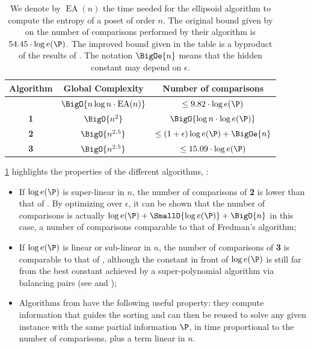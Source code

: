 \begin{table}
	\begin{center}
	\caption{We denote by $\operatorname{EA}(n)$ the time needed for the ellipsoid algorithm
to compute the entropy of a poset of order $n$. The original bound given by
\citet*{kahn:1995} on the number of comparisons performed by their algorithm is
$54.45 \cdot \log e(\P)$. The improved bound given in the table is a byproduct
of the results of \citet*{cardinal:2013}. The notation $\BigOe{n}$ means
that the hidden constant may depend on $\epsilon$.}
	\label{tree:supi:table/jcardin}
	\begin{tabular}{|c|c|c|}

	\hline
	Algorithm & Global Complexity & Number of comparisons\\\hline\hline
	\citet*{kahn:1995} & $\BigO{n \log n \cdot \operatorname{EA}(n)}$ & $\leq 9.82 \cdot \log
e(\P)$\\\hline\hline
	\citet*{cardinal:2013} \textbf{1} & $ \BigO{n^{2}} $ & $\BigO{\log n \cdot
\log e(\P)}$ \\\hline
	\citet*{cardinal:2013} \textbf{2} & $ \BigO{n^{2.5}} $ & $\leq (1 +
\epsilon) \log e(\P) + \BigOe{n}$ \\\hline
	\citet*{cardinal:2013} \textbf{3} & $ \BigO{n^{2.5}} $ & $\leq 15.09 \cdot
\log e(\P)$ \\\hline

	\end{tabular}
	\end{center}
\end{table}


\ref{tree:supi:table/jcardin} highlights the properties of the different
algorithms, \ie:
\begin{itemize}

\item If $\log e(\P)$ is super-linear in $n$, the number of comparisons of
\citet*{cardinal:2013} \textbf{2} is lower than that of \citet*{kahn:1995}. By
optimizing over $\epsilon$, it can be shown that the number of comparisons is
actually $\log e(\P) + \SmallO{\log e(\P)} + \BigO{n}$ in this case, a number of
comparisons comparable to that of Fredman’s algorithm;

\item If $\log e(\P)$ is linear or sub-linear in $n$, the number of comparisons
of \citet*{cardinal:2013} \textbf{3} is comparable to that of
\citet*{kahn:1995}, although the constant in front of $\log e(\P)$ is still far
from the best constant achieved by a super-polynomial algorithm via balancing
pairs (see \citet*{brightwell1995balancing} and
\citet*{brightwell1999balanced});

\item Algorithms from \citet*{cardinal:2013} have the following useful
property: they compute information that guides the sorting and can then be
reused to solve any given instance with the same partial information $\P$, in
time proportional to the number of comparisons, plus a term linear in $n$.

\end{itemize}

